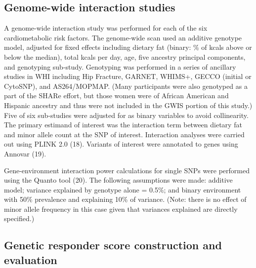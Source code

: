 \documentclass[]{article}
\begin{document}
\hypertarget{genome-wide-interaction-studies}{%
\subsection{Genome-wide interaction
studies}\label{genome-wide-interaction-studies}}

A genome-wide interaction study was performed for each of the six
cardiometabolic risk factors. The genome-wide scan used an additive
genotype model, adjusted for fixed effects including dietary fat
(binary: \% of kcals above or below the median), total kcals per day,
age, five ancestry principal components, and genotyping sub-study.
Genotyping was performed in a series of ancillary studies in WHI
including Hip Fracture, GARNET, WHIMS+, GECCO (initial or CytoSNP), and
AS264/MOPMAP. (Many participants were also genotyped as a part of the
SHARe effort, but those women were of African American and Hispanic
ancestry and thus were not included in the GWIS portion of this study.)
Five of six sub-studies were adjusted for as binary variables to avoid
collinearity. The primary estimand of interest was the interaction term
between dietary fat and minor allele count at the SNP of interest.
Interaction analyses were carried out using PLINK 2.0 (18). Variants of
interest were annotated to genes using Annovar (19).

Gene-environment interaction power calculations for single SNPs were
performed using the Quanto tool (20). The following assumptions were
made: additive model; variance explained by genotype alone = 0.5\%; and
binary environment with 50\% prevalence and explaining 10\% of variance.
(Note: there is no effect of minor allele frequency in this case given
that variances explained are directly specified.)

\hypertarget{genetic-responder-score-construction-and-evaluation}{%
\subsection{Genetic responder score construction and
evaluation}\label{genetic-responder-score-construction-and-evaluation}}
\end{document}
